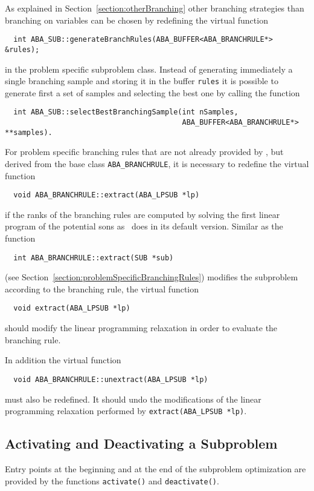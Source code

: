 As explained in Section~\ref{section:otherBranching} other branching
strategies than branching on variables can be chosen by redefining the
virtual function 
\begin{verbatim}
  int ABA_SUB::generateBranchRules(ABA_BUFFER<ABA_BRANCHRULE*> &rules);
\end{verbatim}
in the problem specific subproblem class.
Instead of generating immediately a single branching sample and
storing it in the buffer {\tt rules} it is possible to generate first
a set of samples and selecting the best one by calling the function
\begin{verbatim}
  int ABA_SUB::selectBestBranchingSample(int nSamples,
                                         ABA_BUFFER<ABA_BRANCHRULE*> **samples).
\end{verbatim}
For problem specific branching rules that are not already provided by
\ABACUS, but derived from the base class {\tt ABA\_BRANCHRULE}, it is
necessary to redefine the virtual function
\begin{verbatim}
  void ABA_BRANCHRULE::extract(ABA_LPSUB *lp)
\end{verbatim}
if the ranks of the branching rules are computed by solving the first
linear program of the potential sons as \ABACUS\ does in its default
version. Similar as the function 
\begin{verbatim}
  int ABA_BRANCHRULE::extract(SUB *sub)
\end{verbatim}
(see Section~\ref{section:problemSpecificBranchingRules}) modifies
the subproblem according to the branching rule, the virtual function
\begin{verbatim}
  void extract(ABA_LPSUB *lp) 
\end{verbatim}
should modify the linear programming
relaxation in order to evaluate the branching rule.

In addition the virtual function
\begin{verbatim}
  void ABA_BRANCHRULE::unextract(ABA_LPSUB *lp)
\end{verbatim}
must also be redefined. It should undo the modifications of the
linear programming relaxation performed by {\tt extract(ABA\_LPSUB *lp)}.

\subsection{Activating and Deactivating a Subproblem}
\noindent
Entry points at the beginning and at the end of the subproblem optimization
are provided by the functions 
{\tt activate()} and 
{\tt deactivate()}.

